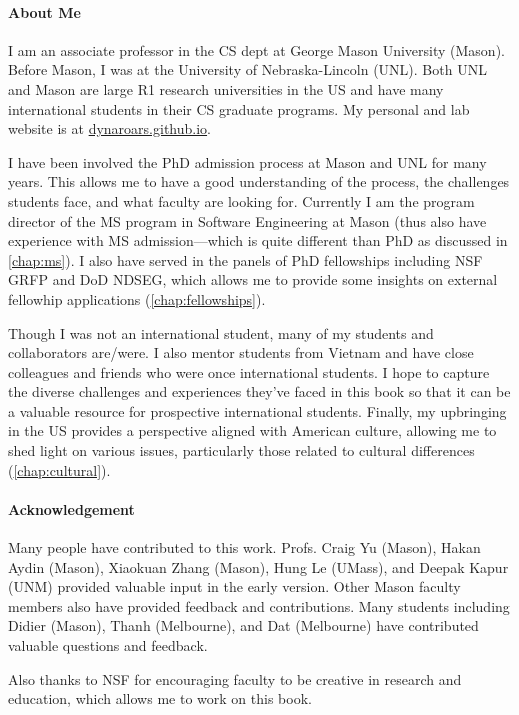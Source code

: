 \documentclass[oneside,11pt,dvipsnames]{book}
\begin{document}
\paragraph{About Me} I am an associate professor in the CS dept at George Mason University (Mason). Before Mason, I was at the University of Nebraska-Lincoln (UNL). Both UNL and Mason are large R1 research universities in the US and have many international students in their CS graduate programs. My personal and lab website is at \href{https://dynaroars.github.io}{dynaroars.github.io}.

I have been involved the PhD admission process at Mason and UNL for many years. This allows me to have a good understanding of the process, the challenges students face, and what faculty are looking for. Currently I am the program director of the MS program in Software Engineering at Mason (thus also have experience with MS admission---which is quite different than PhD as discussed in \autoref{chap:ms}). I also have served in the panels of PhD fellowships including NSF GRFP and DoD NDSEG, which allows me to provide some insights on external fellowhip applications (\autoref{chap:fellowships}).


Though I was not an international student, many of my students and collaborators are/were. I also mentor students from Vietnam and have close colleagues and friends who were once international students. I hope to capture the diverse challenges and experiences they've faced in this book so that it can be a valuable resource for prospective international students.
Finally, my upbringing in the US provides a perspective aligned with American culture, allowing me to shed light on various issues, particularly those related to cultural differences (\autoref{chap:cultural}).




\paragraph{Acknowledgement} Many people have contributed to this work.
Profs. Craig Yu (Mason), Hakan Aydin (Mason), 
Xiaokuan Zhang (Mason), Hung Le (UMass), and Deepak Kapur (UNM) provided valuable input in the early version. Other Mason faculty members also have provided feedback and contributions.  Many students including Didier (Mason), Thanh (Melbourne), and Dat (Melbourne) have contributed valuable questions and feedback. 

Also thanks to NSF for encouraging faculty to be creative in research and education, which allows me to work on this book. 



%
%
\end{document}
